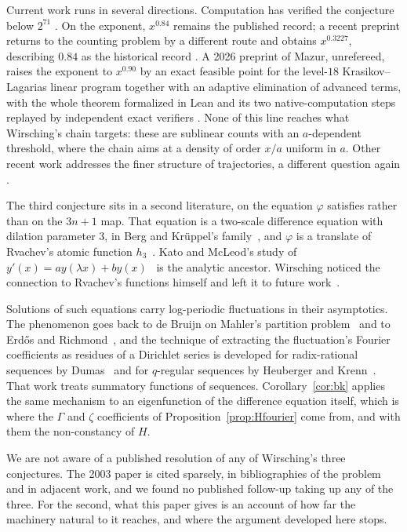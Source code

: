 \documentclass[11pt]{article}
\theoremstyle{definition}
\theoremstyle{remark}
\begin{document}
Current work runs in several directions. Computation has verified the
conjecture below $2^{71}$ \cite{Barina2025}. On the exponent,
$x^{0.84}$ \cite{KrasikovLagarias2003} remains the published record; a
recent preprint returns to the counting problem by a different route
and obtains $x^{0.3227}$, describing $0.84$ as the historical record
\cite{Liu2025}. A 2026 preprint of Mazur, unrefereed, raises the exponent to
$x^{0.90}$ by an exact feasible point for the level-$18$
Krasikov--Lagarias linear program together with an adaptive
elimination of advanced terms, with the whole theorem formalized in
Lean and its two native-computation steps replayed by independent exact
verifiers \cite{Mazur2026}. None of this line reaches what
Wirsching's chain targets: these are sublinear counts with an
$a$-dependent threshold, where the chain aims at a density of order
$x/a$ uniform in $a$. Other recent work addresses the finer structure of
trajectories, a different question again \cite{RozierTerracol2026}.

The third conjecture sits in a second literature, on the equation
$\varphi$ satisfies rather than on the $3n+1$ map. That equation is a
two-scale difference equation with dilation parameter $3$, in Berg and
Kr\"uppel's family~\cite{BergKruppel1998}, and $\varphi$ is a translate
of Rvachev's atomic function $h_3$~\cite{Rvachev1990}. Kato and
McLeod's study of $y'(x)=ay(\lambda x)+by(x)$~\cite{KatoMcLeod1971} is
the analytic ancestor. Wirsching noticed the connection to Rvachev's
functions himself and left it to future work~\cite{Wirsching2001}.

Solutions of such equations carry log-periodic fluctuations in their
asymptotics. The phenomenon goes back to de Bruijn on Mahler's
partition problem~\cite{DeBruijn1948} and to Erd\H{o}s and
Richmond~\cite{ErdosRichmond1976}, and the technique of extracting the
fluctuation's Fourier coefficients as residues of a Dirichlet series is
developed for radix-rational sequences by Dumas~\cite{Dumas2008} and
for $q$-regular sequences by Heuberger and
Krenn~\cite{HeubergerKrenn2018}. That work treats summatory functions
of sequences. Corollary~\ref{cor:bk} applies the same mechanism to an
eigenfunction of the difference equation itself, which is where the
$\Gamma$ and $\zeta$ coefficients of
Proposition~\ref{prop:Hfourier} come from, and with them the
non-constancy of $H$.

We are not aware of a published resolution of any of Wirsching's three
conjectures. The 2003
paper is cited sparsely, in bibliographies of the problem and in adjacent
work, and we found no published follow-up taking up any of the three.
For the
second, what this paper gives is an account of how far the machinery
natural to it reaches, and where the argument developed here stops.
\end{document}
